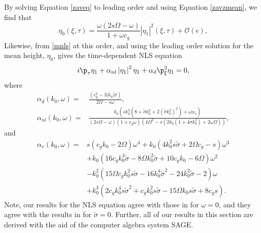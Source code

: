 \documentclass{JFM_Style/jfm}
\begin{document}
By solving Equation \eqref{zaveq} to leading order and using Equation \eqref{zavzmean}, we find that
\begin{equation}
\eta_{0}(\xi,\tau) = \frac{\omega(2s\Omega-\omega)}{1+\omega c_{g}}\left|\eta_{1}\right|^{2}(\xi,\tau) +\mathcal{O}(\epsilon),
\label{zavsol}
\end{equation}
Likewise, from \eqref{mnls} at this order, and using the leading order solution for the mean height, $\eta_{0}$, gives the time-dependent NLS equation
\begin{equation}
i\p_{\tau}\eta_{1} + \alpha_{nl}\left|\eta_{1}\right|^{2}\eta_{1} + \alpha_{d}\p_{\xi}^{2}\eta_{1} = 0,
\label{NLSS}
\end{equation}
where
\begin{align*}
\alpha_{d}(k_{0},\omega) = & \frac{(c^2_{g} - 3|k_{0}|\tilde{\sigma})}{2\Omega-s\omega},\\
\alpha_{nl}(k_{0},\omega) = & \frac{k_{0}\left( sk_{0}^{3}\left(8 + \tilde{\sigma}k_{0}^{2} + 2(\tilde{\sigma}k_{0}^{2})^{2}\right) + \omega \alpha_{v}\right)}{\left(2s\Omega -\omega\right)(1+c_{g}\omega)\left(4\Omega^2-s(2k_{0}(1+4\tilde{\sigma}k_{0}^{2})+2\omega\Omega)\right)},
\end{align*}
and
\begin{align*}
\alpha_{v}(k_{0},\omega)= & s(c_g k_0  - 2\Omega ) \omega^4 + k_{0}(4 k_{0}^{2} s \tilde{\sigma} + 2 \Omega c_g  -s) \omega^3 \\
& + k_{0}(16 c_g k_{0}^{3} \tilde{\sigma} - 8 \Omega k_{0}^{2} \tilde{\sigma} + 10 c_g k_{0} - 6 \Omega) \omega^2 \\
& -  k_{0}^{2}(15 \Omega c_g k_0^2 s \tilde{\sigma} - 16 k_{0}^{4} \tilde{\sigma}^2 - 24 k_{0}^{2} \tilde{\sigma} - 2 ) \omega \\
& + k_{0}^{3}(2 c_g k_{0}^{4} s \tilde{\sigma}^2 + c_g k_{0}^{2} s \tilde{\sigma} - 15 \Omega k_{0}  s \tilde{\sigma} + 8c_g s).
\end{align*}
Note, our results for the NLS equation agree with those in \cite{afm} for $\omega=0$, and they agree with the results in \cite{thomas2012nonlinear} for $\tilde{\sigma}=0$.  Further, all of our results in this section are derived with the aid of the computer algebra system SAGE.
\end{document}
